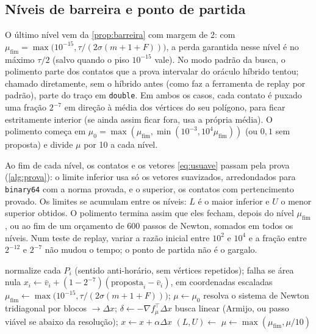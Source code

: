 \documentclass[11pt,a4paper]{article}
\theoremstyle{plain}\newtheorem{proposicao}{Proposição}
\theoremstyle{definition}\newtheorem{definicao}{Definição}
\theoremstyle{plain}\newtheorem{teorema}{Teorema}
\newcommand{\code}[1]{\texttt{\small #1}}
\begin{document}
\subsection{Níveis de barreira e ponto de partida}
O último nível vem da \cref{prop:barreira} com margem de 2: com \(\mu_{\text{fim}}=\max\bigl(10^{-15},\tau/(2\sigma(m+1+F))\bigr)\), a perda garantida nesse nível é no máximo \(\tau/2\) (salvo quando o piso \(10^{-15}\) vale). No modo padrão da busca, o polimento parte dos contatos que a prova intervalar do oráculo híbrido tentou; chamado diretamente, sem o híbrido antes (como faz a ferramenta de replay por padrão), parte do traço em \texttt{double}. Em ambos os casos, cada contato é puxado uma fração \(2^{-7}\) em direção à média dos vértices do seu polígono, para ficar estritamente interior (se ainda assim ficar fora, usa a própria média). O polimento começa em \(\mu_0=\max(\mu_{\text{fim}},\min(10^{-3},10^4\mu_{\text{fim}}))\) (ou \(0{,}1\) sem proposta) e divide \(\mu\) por 10 a cada nível.

Ao fim de cada nível, os contatos e os vetores \eqref{eq:usuave} passam pela prova (\cref{alg:prova}): o limite inferior usa só os vetores suavizados, arredondados para \texttt{binary64} com a norma provada, e o superior, os contatos com pertencimento provado. Os limites se acumulam entre os níveis: \(L\) é o maior inferior e \(U\) o menor superior obtidos. O polimento termina assim que eles fecham, depois do nível \(\mu_{\text{fim}}\), ou ao fim de um orçamento de 600 passos de Newton, somados em todos os níveis. Num teste de replay, variar a razão inicial entre \(10^2\) e \(10^4\) e a fração entre \(2^{-12}\) e \(2^{-7}\) não mudou o tempo; o ponto de partida não é o gargalo.

\begin{algorithm}[ht]\small
\caption{Polimento por pontos interiores (\code{tpp\_convex\_solve\_float\_certified}).}\label{alg:polimento}
\begin{algorithmic}[1]
  \State normalize cada $P_i$ (sentido anti-horário, sem vértices repetidos); falha se área nula
  \State $x_i\gets\bar v_i+(1-2^{-7})(\text{proposta}_i-\bar v_i)$, em coordenadas escaladas
  \State $\mu_{\text{fim}}\gets\max\bigl(10^{-15},\tau/(2\sigma(m+1+F))\bigr)$; $\mu\gets\mu_0$
  \Loop
      \State resolva o sistema de Newton tridiagonal por blocos $\to\Delta x$; $\delta\gets-\nabla f_\mu^{\top}\Delta x$
      \State busca linear (Armijo, ou passo viável se abaixo da resolução); $x\gets x+\alpha\Delta x$
    \EndWhile
    \State $(L,U)\gets$ 
    \State $\mu\gets\max(\mu_{\text{fim}},\mu/10)$
  \EndLoop
\EndFunction
\end{algorithmic}
\end{algorithm}
\end{document}
